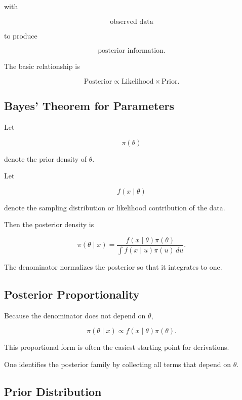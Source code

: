 with

\[
\boxed{
\text{observed data}
}
\]

to produce

\[
\boxed{
\text{posterior information}.
}
\]

The basic relationship is

\[
\boxed{
\text{Posterior}
\propto
\text{Likelihood}
\times
\text{Prior}.
}
\]

\subsection{Bayes' Theorem for Parameters}
\label{subsec:bayes-theorem-parameters}

Let

\[
\pi(\theta)
\]

denote the prior density of \(\theta\).

Let

\[
f(x\mid\theta)
\]

denote the sampling distribution or likelihood contribution of the data.

Then the posterior density is

\[
\boxed{
\pi(\theta\mid x)
=
\frac{
f(x\mid\theta)\pi(\theta)
}{
\int
f(x\mid u)\pi(u)\,du
}.
}
\]

The denominator normalizes the posterior so that it integrates to one.

\subsection{Posterior Proportionality}
\label{subsec:posterior-proportionality}

Because the denominator does not depend on \(\theta\),

\[
\boxed{
\pi(\theta\mid x)
\propto
f(x\mid\theta)\pi(\theta).
}
\]

This proportional form is often the easiest starting point for
derivations.

One identifies the posterior family by collecting all terms that depend
on \(\theta\).

\subsection{Prior Distribution}
\label{subsec:prior-distribution}

